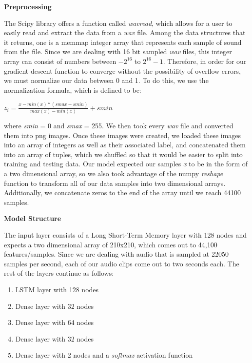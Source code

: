 \documentclass[12pt,journal,compsoc]{IEEEtran}
\begin{document}
\begin{center}
	\textbf{Preprocessing}
\end{center}

The Scipy library offers a function called \textit{wavread}, which allows for a user to easily read and extract the data from a \textit{wav} file. Among the data structures that it returns, one is a memmap integer array that represents each sample of sound from the file. Since we are dealing with 16 bit sampled \textit{wav} files, this integer array can consist of numbers between $-2^{16}$ to $2^{16}-1$. Therefore, in order for our gradient descent function to converge without the possibility of overflow errors, we must normalize our data between 0 and 1. To do this, we use the normalization formula, which is defined to be:

\begin{center}
$z_i=\frac{x-min(x)*(smax-smin)}{max(x)-min(x)} + smin$
\end{center}

where \textit{smin} = 0 and \textit{smax} = 255. We then took every \textit{wav} file and converted them into png images. Once these images were created, we loaded these images into an array of integers as well as their associated label, and concatenated them into an array of tuples, which we shuffled so that it would be easier to split into training and testing data. Our model expected our samples \textit{x} to be in the form of a two dimensional array, so we also took advantage of the numpy \textit{reshape} function to transform all of our data samples into two dimensional arrays. Additionally, we concatenate zeros to the end of the array until we reach 44100 samples. 

\begin{center}
	\textbf{Model Structure}
\end{center}

The input layer consists of a Long Short-Term Memory layer with 128 nodes and expects a two dimensional array of 210x210, which comes out to 44,100 features/samples. Since we are dealing with audio that is sampled at 22050 samples per second, each of our audio clips come out to two seconds each. The rest of the layers continue as follows:

\begin{enumerate}
	\item LSTM layer with 128 nodes
	\item Dense layer with 32 nodes
	\item Dense layer with 64 nodes
	\item Dense layer with 32 nodes
	\item Dense layer with 2 nodes and a \textit{softmax} activation function
\end{enumerate}
\end{document}
